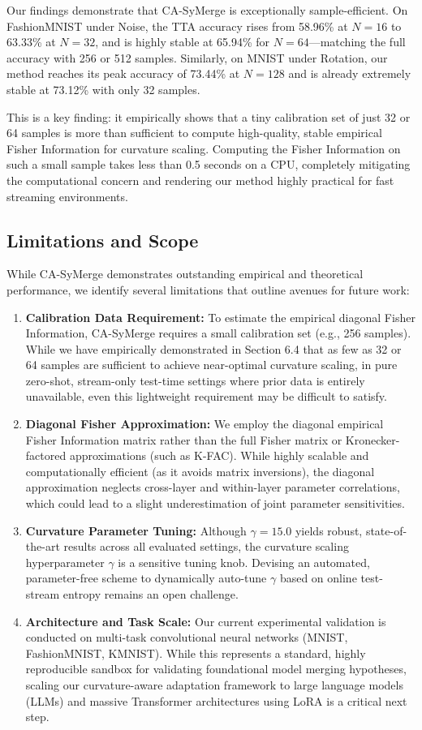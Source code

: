 \documentclass{article}
\begin{document}
Our findings demonstrate that CA-SyMerge is exceptionally sample-efficient. On Fashion\-MNIST under Noise, the TTA accuracy rises from 58.96\% at $N = 16$ to 63.33\% at $N = 32$, and is highly stable at 65.94\% for $N = 64$---matching the full accuracy with 256 or 512 samples. Similarly, on MNIST under Rotation, our method reaches its peak accuracy of 73.44\% at $N = 128$ and is already extremely stable at 73.12\% with only 32 samples. 

This is a key finding: it empirically shows that a tiny calibration set of just 32 or 64 samples is more than sufficient to compute high-quality, stable empirical Fisher Information for curvature scaling. Computing the Fisher Information on such a small sample takes less than 0.5 seconds on a CPU, completely mitigating the computational concern and rendering our method highly practical for fast streaming environments.

\subsection{Limitations and Scope}
While CA-SyMerge demonstrates outstanding empirical and theoretical performance, we identify several limitations that outline avenues for future work:
\begin{enumerate}\itemsep=0pt\parsep=0pt\topsep=2pt
    \item \textbf{Calibration Data Requirement:} To estimate the empirical diagonal Fisher Information, CA-SyMerge requires a small calibration set (e.g., 256 samples). While we have empirically demonstrated in Section 6.4 that as few as 32 or 64 samples are sufficient to achieve near-optimal curvature scaling, in pure zero-shot, stream-only test-time settings where prior data is entirely unavailable, even this lightweight requirement may be difficult to satisfy.
    \item \textbf{Diagonal Fisher Approximation:} We employ the diagonal empirical Fisher Information matrix rather than the full Fisher matrix or Kronecker-factored approximations (such as K-FAC). While highly scalable and computationally efficient (as it avoids matrix inversions), the diagonal approximation neglects cross-layer and within-layer parameter correlations, which could lead to a slight underestimation of joint parameter sensitivities.
    \item \textbf{Curvature Parameter Tuning:} Although $\gamma = 15.0$ yields robust, state-of-the-art results across all evaluated settings, the curvature scaling hyperparameter $\gamma$ is a sensitive tuning knob. Devising an automated, parameter-free scheme to dynamically auto-tune $\gamma$ based on online test-stream entropy remains an open challenge.
    \item \textbf{Architecture and Task Scale:} Our current experimental validation is conducted on multi-task convolutional neural networks (MNIST, FashionMNIST, KMNIST). While this represents a standard, highly reproducible sandbox for validating foundational model merging hypotheses, scaling our curvature-aware adaptation framework to large language models (LLMs) and massive Transformer architectures using LoRA is a critical next step.
\end{enumerate}
\end{document}
